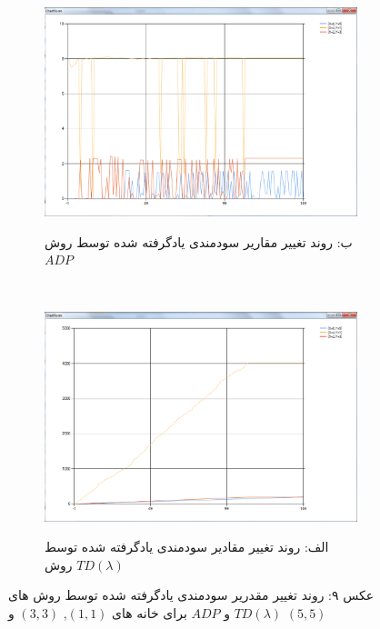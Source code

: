 \documentclass[10pt,a4paper]{article}
\begin{document}
\begin{figure}[h]
        \centering
        \begin{subfigure}[b]{0.5\textwidth}
            \includegraphics[width=\textwidth]{q-adp}
            \begin{center}
                \textarabic{ب: روند تغییر مقاریر سودمندی یادگرفته شده توسط روش $ADP$ }
            \end{center}
        \end{subfigure}%
        ~ %
        \begin{subfigure}[b]{0.5\textwidth}
           \includegraphics[width=\textwidth]{q-td}
            \begin{center}
                \textarabic{الف: روند تغییر مقادیر سودمندی یادگرفته شده توسط روش $TD(\lambda)$ }
            \end{center}
        \end{subfigure}
    \begin{center}
    \textarabic{عکس ۹: روند تغییر مقدریر سودمندی یادگرفته شده توسط روش های
     $TD(\lambda)$ و $ADP$
      برای خانه های 
     $(1, 1)$, $(3,3)$ 
     و
      $(5, 5)$
     }
    \end{center}
\end{figure}
\end{document}
